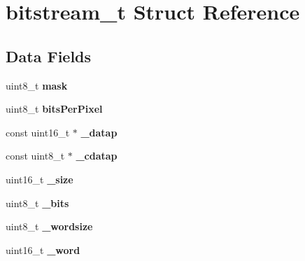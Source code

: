 \hypertarget{structbitstream__t}{\section{bitstream\+\_\+t Struct Reference}
\label{structbitstream__t}
}
\subsection*{Data Fields}
\begin{DoxyCompactItemize}
\item 
\hypertarget{structbitstream__t_a8a74907784be6c7786c2d060c8d7e10b}{uint8\+\_\+t {\bfseries mask}}\label{structbitstream__t_a8a74907784be6c7786c2d060c8d7e10b}

\item 
\hypertarget{structbitstream__t_a6a3c851ca52ea8aa201b6753a4585736}{uint8\+\_\+t {\bfseries bits\+Per\+Pixel}}\label{structbitstream__t_a6a3c851ca52ea8aa201b6753a4585736}

\item 
\hypertarget{structbitstream__t_ac6b93613aac5d1f99bb7110cd3225c50}{const uint16\+\_\+t $\ast$ {\bfseries \+\_\+datap}}\label{structbitstream__t_ac6b93613aac5d1f99bb7110cd3225c50}

\item 
\hypertarget{structbitstream__t_a6fa0b0c0df2bc324f2e6bdc034128700}{const uint8\+\_\+t $\ast$ {\bfseries \+\_\+cdatap}}\label{structbitstream__t_a6fa0b0c0df2bc324f2e6bdc034128700}

\item 
\hypertarget{structbitstream__t_aa634b952549ebb0aa1c5f90330b66f76}{uint16\+\_\+t {\bfseries \+\_\+size}}\label{structbitstream__t_aa634b952549ebb0aa1c5f90330b66f76}

\item 
\hypertarget{structbitstream__t_ac7b691cab37efadfad1f6f8739dfe125}{uint8\+\_\+t {\bfseries \+\_\+bits}}\label{structbitstream__t_ac7b691cab37efadfad1f6f8739dfe125}

\item 
\hypertarget{structbitstream__t_a1247e14eec68041248d6d71040b151a2}{uint8\+\_\+t {\bfseries \+\_\+wordsize}}\label{structbitstream__t_a1247e14eec68041248d6d71040b151a2}

\item 
\hypertarget{structbitstream__t_a957c357acebf129016c23a180c55a138}{uint16\+\_\+t {\bfseries \+\_\+word}}\label{structbitstream__t_a957c357acebf129016c23a180c55a138}


\end{DoxyCompactItemize}
